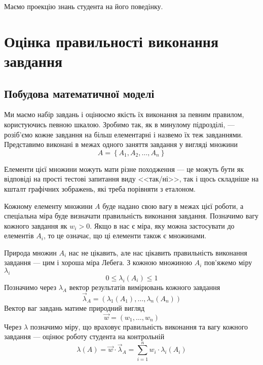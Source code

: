 Маємо проекцію знань студента на його поведінку.

\section{Оцінка правильності виконання завдання}

\subsection{Побудова математичної моделі}

Ми маємо набір завдань і оцінюємо якість їх виконання за певним правилом,
користуючись певною шкалою.
Зробимо так, як в минулому підрозділі, --- розіб’ємо кожне завдання на більш
елементарні і назвемо їх теж завданнями.
Представимо виконані в межах одного заняття завдання у вигляді множини
\begin{equation*}
  A = \left\{ A_1, A_2, \dots, A_n \right\}
\end{equation*}

Елементи цієї множини можуть мати різне походження --- це можуть бути як
відповіді на прості тестові запитання виду <<так/ні>>, так і щось складніше на
кшталт графічних зображень, які треба порівняти з еталоном.

Кожному елементу множини $A$ буде надано свою вагу в межах цієї роботи,
а спеціальна міра буде визначати правильність виконання завдання.
Позначимо вагу кожного завдання як $w_i > 0$.
Якщо в нас є міра, яку можна застосувати до елементів $A_i$, то це означає, що
ці елементи також є множинами.

Природа множин $A_i$ нас не цікавить, але нас цікавить правильність виконання
завдання --- цим і хороша міра Лебега.
З кожною множиною $A_i$ пов’яжемо міру $\lambda_i$
\begin{equation*}
  0 \le \lambda_i\left( A_i \right) \le 1
\end{equation*}
Позначимо через $\lambda_A$ вектор результатів вимірювань кожного завдання
\begin{equation*}
  \vec{\lambda}_A
  = \left( \lambda_1\left( A_1 \right), \dots,
    \lambda_n\left( A_n \right) \right)
\end{equation*}
Вектор ваг завдань матиме природний вигляд
\begin{equation*}
  \vec{w} = \left( w_1, \dots, w_n \right)
\end{equation*}
Через $\lambda$ позначимо міру, що враховує правильність виконання та вагу
кожного завдання --- оцінює роботу студента на контрольній
\begin{equation}\label{eq:measuresAndWeights}
  \lambda\left( A \right)
  = \vec{w} \cdot \vec{\lambda}_A
  = \sum_{i=1}^{n} w_i \cdot \lambda_i\left( A_i \right)
\end{equation}

